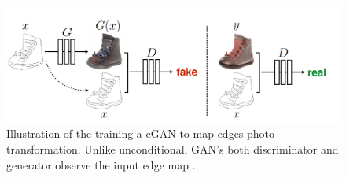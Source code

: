 \begin{figure}[H]
        \begin{center}
 	    \includegraphics[scale=0.30]{images/relatedWorks/CGAN.png}
	    \caption[Illustration of training a \ac{cGAN} to map edges \textrightarrow photo transformation.]{Illustration of the training a \ac{cGAN} to map edges \textrightarrow photo transformation. Unlike unconditional, \ac{GAN}'s both discriminator and generator observe the input edge map \cite{isola2018imagetoimage}.}
	    \label{fig:CGAN}
	    \end{center}
\end{figure}




